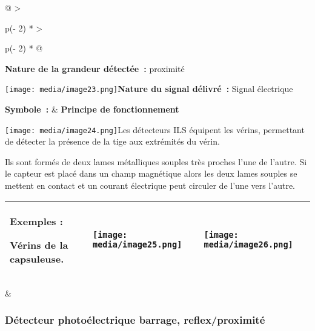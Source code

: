 \documentclass[
]{article}
\begin{document}
\begin{longtable}[]{@{}
  >{\raggedright\arraybackslash}p{(\columnwidth - 2\tabcolsep) * }
  >{\raggedright\arraybackslash}p{(\columnwidth - 2\tabcolsep) * }@{}}
\toprule
\textbf{Nature de la grandeur détectée~:} proximité

\texttt{[image: media/image23.png]}\textbf{Nature
du signal délivré~:} Signal électrique

\textbf{Symbole~:} & \textbf{Principe de fonctionnement}

\texttt{[image: media/image24.png]}Les
détecteurs ILS équipent les vérins, permettant de détecter la présence
de la tige aux extrémités du vérin.

Ils sont formés de deux lames métalliques souples très proches l'une de
l'autre. Si le capteur est placé dans un champ magnétique alors les deux
lames souples se mettent en contact et un courant électrique peut
circuler de l'une vers l'autre. \\
\midrule
\endhead
\begin{minipage}[t]{\linewidth}\raggedright
\begin{longtable}[]{@{}
  >{\raggedright\arraybackslash}p{}
  >{\raggedright\arraybackslash}p{}
  >{\raggedright\arraybackslash}p{}@{}}
\toprule
\endhead
\textbf{Exemples :}

Vérins de la capsuleuse. &
\texttt{[image: media/image25.png]} &
\texttt{[image: media/image26.png]} \\
\bottomrule
\end{longtable}
\end{minipage} & \\
\bottomrule
\end{longtable}

\hypertarget{duxe9tecteur-photouxe9lectrique-barrage-reflexproximituxe9}{%
\subsubsection{Détecteur photoélectrique barrage,
reflex/proximité}\label{duxe9tecteur-photouxe9lectrique-barrage-reflexproximituxe9}}
\end{document}
